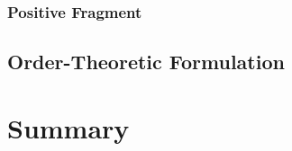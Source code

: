 \documentclass[11pt]{article}
\begin{document}
\subsubsection{Positive Fragment}\label{subsubsec:ipl_posfrag}

\subsection{Order-Theoretic Formulation}\label{subsec:ipl_order}

\section{Summary}\label{sec:summary}







\end{document}
